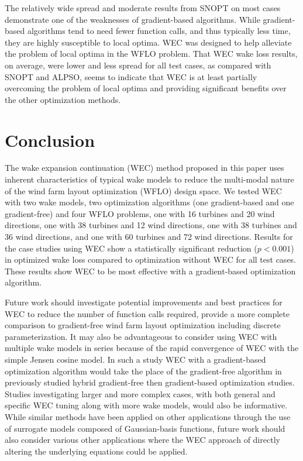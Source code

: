 \documentclass{jpconf}
\begin{document}
The relatively wide spread and moderate results from SNOPT on most cases demonstrate one of the weaknesses of gradient-based algorithms. While gradient-based algorithms tend to need fewer function calls, and thus typically less time, they are highly susceptible to local optima. WEC was designed to help alleviate the problem of local optima in the WFLO problem. That WEC wake loss results, on average, were lower and less spread for all test cases, as compared with SNOPT and ALPSO, seems to indicate that WEC is at least partially overcoming the problem of local optima and providing significant benefits over the other optimization methods.

\section{Conclusion}\label{sec:conclusion}
The wake expansion continuation (WEC) method proposed in this paper uses inherent characteristics of typical wake models to reduce the multi-modal nature of the wind farm layout optimization (WFLO) design space. We tested WEC with two wake models, two optimization algorithms (one gradient-based and one gradient-free) and four WFLO problems, one with 16 turbines and 20 wind directions, one with 38 turbines and 12 wind directions, one with 38 turbines and 36 wind directions, and one with 60 turbines and 72 wind directions. Results for the case studies using WEC show a statistically significant reduction  ($p<0.001$) in optimized wake loss compared to optimization without WEC for all test cases. These results show WEC to be most effective with a gradient-based optimization algorithm.

Future work should investigate potential improvements and best practices for WEC to reduce the number of function calls required, provide a more complete comparison to gradient-free wind farm layout optimization including discrete parameterization. It may also be advantageous to consider using WEC with multiple wake models in series because of the rapid convergence of WEC with the simple Jensen cosine model. In such a study WEC with a gradient-based optimization algorithm would take the place of the gradient-free algorithm in previously studied hybrid gradient-free then gradient-based optimization studies. Studies investigating larger and more complex cases, with both general and specific WEC tuning along with more wake models, would also be informative. While similar methods have been applied on other applications through the use of surrogate models composed of Gaussian-basis functions, future work should also consider various other applications where the WEC approach of directly altering the underlying equations could be applied.
\end{document}
